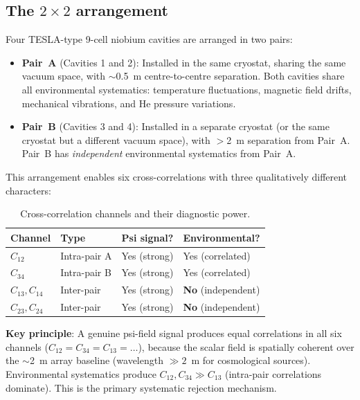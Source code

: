 \documentclass[11pt]{article}
\begin{document}
\subsection{The $2\times 2$ arrangement}

Four TESLA-type 9-cell niobium cavities are arranged in two pairs:

\begin{itemize}
\item \textbf{Pair~A} (Cavities 1 and 2): Installed in the same
  cryostat, sharing the same vacuum space, with $\sim$0.5~m centre-to-centre
  separation. Both cavities share all environmental systematics:
  temperature fluctuations, magnetic field drifts, mechanical
  vibrations, and He pressure variations.

\item \textbf{Pair~B} (Cavities 3 and 4): Installed in a separate
  cryostat (or the same cryostat but a different vacuum space), with
  $>$2~m separation from Pair~A. Pair~B has \textit{independent}
  environmental systematics from Pair~A.
\end{itemize}

This arrangement enables six cross-correlations with three
qualitatively different characters:

\begin{table}[H]
\centering
\caption{Cross-correlation channels and their diagnostic power.}
\label{tab:xcorr}
\renewcommand{\arraystretch}{1.2}
\begin{tabular}{@{}llll@{}}
\toprule
\textbf{Channel} & \textbf{Type} & \textbf{Psi signal?} &
  \textbf{Environmental?} \\
\midrule
$C_{12}$ & Intra-pair A & Yes (strong) & Yes (correlated) \\
$C_{34}$ & Intra-pair B & Yes (strong) & Yes (correlated) \\
$C_{13}, C_{14}$ & Inter-pair & Yes (strong) & \textbf{No} (independent) \\
$C_{23}, C_{24}$ & Inter-pair & Yes (strong) & \textbf{No} (independent) \\
\bottomrule
\end{tabular}
\end{table}

\noindent\textbf{Key principle}: A genuine psi-field signal produces
equal correlations in all six channels ($C_{12} = C_{34} = C_{13}
= \ldots$), because the scalar field is spatially coherent over the
$\sim$2~m array baseline (wavelength $\gg 2$~m for cosmological
sources). Environmental systematics produce $C_{12}, C_{34} \gg C_{13}$
(intra-pair correlations dominate). This is the primary systematic
rejection mechanism.
\end{document}
